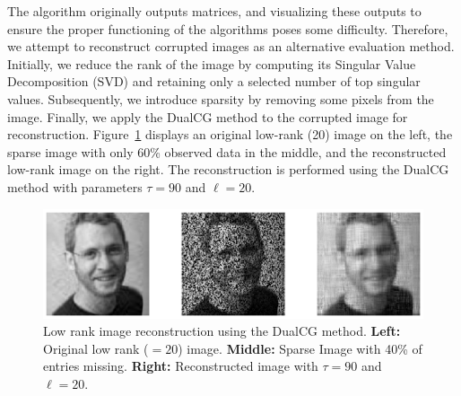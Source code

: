 \documentclass[10pt, twocolumn, reqno, a4paper,oneside]{amsart}
\numberwithin{equation}{section}
\numberwithin{theorem}{section}
\numberwithin{figure}{section}
\numberwithin{table}{section}
\numberwithin{theorem}{section}
\numberwithin{equation}{section}
\begin{document}
The algorithm originally outputs matrices, and visualizing these outputs to ensure the proper functioning of the algorithms poses some difficulty. Therefore, we attempt to reconstruct corrupted images as an alternative evaluation method.
Initially, we reduce the rank of the image by computing its Singular Value Decomposition (SVD) and retaining only a selected number of top singular values. Subsequently, we introduce sparsity by removing some pixels from the image. Finally, we apply the DualCG method to the corrupted image for reconstruction.
Figure~\ref{fig:MPF} displays an original low-rank (20) image on the left, the sparse image with only 60\% observed data in the middle, and the reconstructed low-rank image on the right. The reconstruction is performed using the DualCG method with parameters $\tau = 90$ and $\ell = 20$.
\begin{figure}
	\centering
	\includegraphics[trim = 55 100 40 100, clip, width=0.99\linewidth]{figs/MPF.eps}
	\caption{Low rank image reconstruction using the DualCG method. {\bf Left:} Original low rank ($= 20$) image. {\bf Middle:} Sparse Image with 40\% of entries missing. {\bf Right:} Reconstructed image with $\tau = 90$ and $\ell = 20$. }\label{fig:MPF}
\end{figure}
\end{document}
